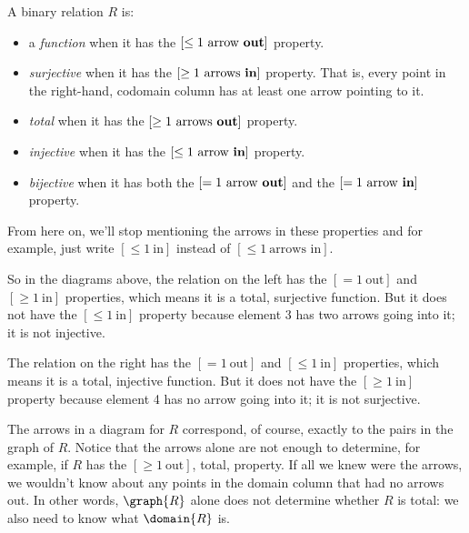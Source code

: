 \begin{definition}\label{archery-def}
A binary relation $R$ is:
\begin{itemize}

\item a \emph{function}%
when it has the $[\le 1\ \text{arrow
    \textbf{out}}]$ property.

\item  \emph{surjective}%
%
when it has the $[\ge 1\ \text{arrows
    \textbf{in}}]$ property.  That is, every point in the right-hand,
     codomain column has at least one arrow pointing to it.

\item  \emph{total} %
%
when it has the $[\ge 1\ \text{arrows
       \textbf{out}}]$ property.

\item  \emph{injective}%
%
when it has the $[\le 1\ \text{arrow
    \textbf{in}}]$ property.

\item  \emph{bijective}%
%
 when it has both the $[=1\ \text{arrow
    \textbf{out}}]$ and the $[=1\ \text{arrow \textbf{in}}]$ property.
\end{itemize}
\end{definition}

From here on, we'll stop mentioning the arrows in these properties and for
example, just write $[\le 1\ \text{in}]$ instead of $[\le 1\ \text{arrows
  in}]$.

So in the diagrams above, the relation on the left has the
$[=1\ \text{out}]$ and $[\ge 1\ \text{in}]$ properties, which means it
is a total, surjective function.  But it does not have the $[\le
  1\ \text{in}]$ property because element 3 has two arrows going into
it; it is not injective.

The relation on the right has the $[=1\ \text{out}]$ and $[\le
  1\ \text{in}]$ properties, which means it is a total, injective
function.  But it does not have the $[\ge 1\ \text{in}]$ property
because element 4 has no arrow going into it; it is
not surjective.

The arrows in a diagram for $R$ correspond, of course, exactly to the
pairs in the graph of $R$.  Notice that the arrows alone are not
enough to determine, for example, if $R$ has the $[\ge
  1\ \text{out}]$, total, property.  If all we knew were the arrows,
we wouldn't know about any points in the domain column that had no
arrows out.  In other words, $\graph{R}$ alone does not determine
whether $R$ is total: we also need to know what $\domain{R}$ is.

